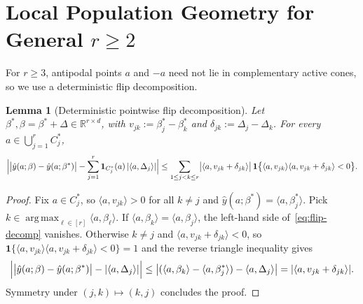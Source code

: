 \documentclass[11pt]{article}
\theoremstyle{plain}
\newtheorem{lemma}[theorem]{Lemma}
\theoremstyle{remark}
\numberwithin{equation}{section}
\newcommand{\R}{\mathbb{R}}
\newcommand{\ind}{\mathbf{1}}
\newcommand{\ip}[2]{\langle #1, #2 \rangle}
\newcommand{\argmax}{\operatorname*{arg\,max}}
\begin{document}
\section{Local Population Geometry for General \texorpdfstring{$r \ge 2$}{r >= 2}}
\label{sec:pop-genr}

For $r \ge 3$, antipodal points $a$ and $-a$ need not lie in complementary active cones, so we use a deterministic flip decomposition.

\begin{lemma}[Deterministic pointwise flip decomposition]
  \label{lem:flip-decomp}
  Let $\beta^*, \beta = \beta^* + \Delta \in \R^{r \times d}$, with $v_{jk} := \beta_j^* - \beta_k^*$ and $\delta_{jk} := \Delta_j - \Delta_k$. For every $a \in \bigcup_{j=1}^r C_j^*$,
  \begin{equation}
    \label{eq:flip-decomp}
    \Bigl|\bigl|\hat y(a; \beta) - \hat y(a; \beta^*)\bigr| - \sum_{j=1}^r \ind_{C_j^*}(a)\,|\ip{a}{\Delta_j}|\Bigr|
    \le \sum_{1 \le j < k \le r} \bigl|\ip{a}{v_{jk} + \delta_{jk}}\bigr|\,\ind\bigl\{\ip{a}{v_{jk}}\ip{a}{v_{jk} + \delta_{jk}} < 0\bigr\}.
  \end{equation}
\end{lemma}
\begin{proof}
Fix $a \in C_j^*$, so $\ip{a}{v_{jk}} > 0$ for all $k \ne j$ and $\hat y(a; \beta^*) = \ip{a}{\beta_j^*}$. Pick $k \in \argmax_{\ell \in [r]} \ip{a}{\beta_\ell}$. If $\ip{a}{\beta_k} = \ip{a}{\beta_j}$, the left-hand side of~\eqref{eq:flip-decomp} vanishes. Otherwise $k \ne j$ and $\ip{a}{v_{jk} + \delta_{jk}} < 0$, so $\ind\{\ip{a}{v_{jk}}\ip{a}{v_{jk} + \delta_{jk}} < 0\} = 1$ and the reverse triangle inequality gives
\[
  \Bigl|\bigl|\hat y(a; \beta) - \hat y(a; \beta^*)\bigr| - |\ip{a}{\Delta_j}|\Bigr|
  \le \bigl|(\ip{a}{\beta_k} - \ip{a}{\beta_j^*}) - \ip{a}{\Delta_j}\bigr|
  = |\ip{a}{v_{jk} + \delta_{jk}}|.
\]
Symmetry under $(j, k) \mapsto (k, j)$ concludes the proof.
\end{proof}
\end{document}
